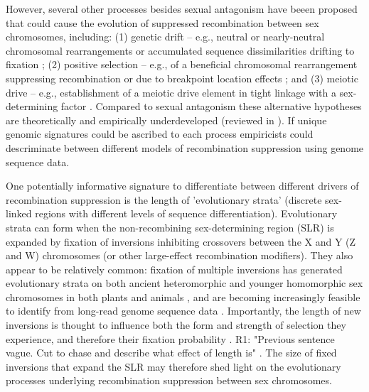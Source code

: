 \documentclass{article}[12pt]
\newcommand\hl[1]{%
  \bgroup
  \hskip0pt\color{blue!80!black}%
  #1%
  \egroup
}
\begin{document}
However, several other processes besides sexual antagonism have beeen proposed that could cause the evolution of suppressed recombination between sex chromosomes, including: (1) genetic drift -- e.g., neutral or nearly-neutral chromosomal rearrangements or accumulated sequence dissimilarities drifting to fixation \citep{CharlesworthMarais2005}; (2) positive selection -- e.g., of a beneficial chromosomal rearrangement suppressing recombination \citep{Haldane1957} or due to breakpoint location effects \citep{CorbettDetig2016}; and (3) meiotic drive -- e.g., establishment of a meiotic drive element in tight linkage with a sex-determining factor \citep{UbedaPatten2010}. Compared to sexual antagonism these alternative hypotheses are theoretically and empirically underdeveloped (reviewed in \citealt{Ironside2010, Ponnikas2018}). If unique genomic signatures could be ascribed to each process empiricists could descriminate between different models of recombination suppression using genome sequence data. 

One potentially informative signature to differentiate between different drivers of recombination suppression is the length of 'evolutionary strata' (discrete sex-linked regions with different levels of sequence differentiation). Evolutionary strata can form when the non-recombining sex-determining region (SLR) is expanded by fixation of inversions inhibiting crossovers between the X and Y (Z and W) chromosomes (or other large-effect recombination modifiers). They also appear to be relatively common: fixation of multiple inversions has generated evolutionary strata on both ancient heteromorphic and younger homomorphic sex chromosomes in both plants and animals \citep{LahnPage1999,Handley2004, Wang2012}, and are becoming increasingly feasible to identify from long-read genome sequence data \citep{WellenreutherBernatchez2018}. Importantly, the length of new inversions is thought to influence both the form and strength of selection they experience, and therefore their fixation probability \citep{vanValenLevins1968, KrimbasPowell1992}. \hl{R1: "Previous sentence vague. Cut to chase and describe what effect of length is"}. The size of fixed inversions that expand the SLR may therefore shed light on the evolutionary processes underlying recombination suppression between sex chromosomes. 
\end{document}
